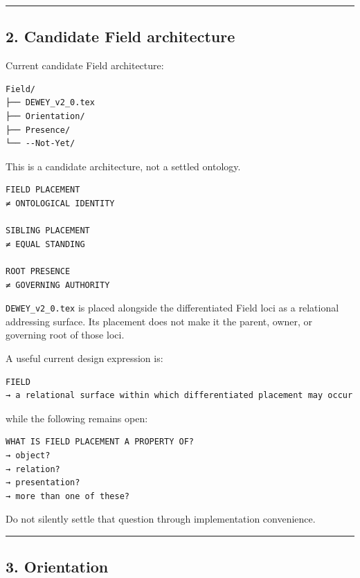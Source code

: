 \begin{center}\rule{0.5\linewidth}{0.5pt}\end{center}

\subsection{2. Candidate Field
architecture}\label{candidate-field-architecture}

Current candidate Field architecture:

\begin{verbatim}
Field/
├── DEWEY_v2_0.tex
├── Orientation/
├── Presence/
└── --Not-Yet/
\end{verbatim}

This is a candidate architecture, not a settled ontology.

\begin{verbatim}
FIELD PLACEMENT
≠ ONTOLOGICAL IDENTITY

SIBLING PLACEMENT
≠ EQUAL STANDING

ROOT PRESENCE
≠ GOVERNING AUTHORITY
\end{verbatim}

\texttt{DEWEY\_v2\_0.tex} is placed alongside the differentiated Field
loci as a relational addressing surface. Its placement does not make it
the parent, owner, or governing root of those loci.

A useful current design expression is:

\begin{verbatim}
FIELD
→ a relational surface within which differentiated placement may occur
\end{verbatim}

while the following remains open:

\begin{verbatim}
WHAT IS FIELD PLACEMENT A PROPERTY OF?
→ object?
→ relation?
→ presentation?
→ more than one of these?
\end{verbatim}

Do not silently settle that question through implementation convenience.

\begin{center}\rule{0.5\linewidth}{0.5pt}\end{center}

\subsection{3. Orientation}\label{orientation}

